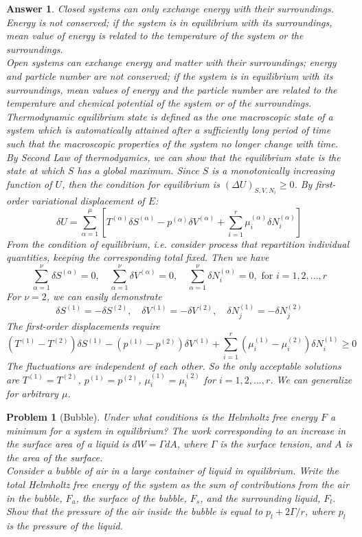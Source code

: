 \documentclass[a4paper]{article}
\newtheorem{ans}{Answer}[section]
\theoremstyle{new}
\newtheorem{qns}{Problem}[section]
\begin{document}
\begin{ans}
Closed systems can only exchange energy with their surroundings. Energy is not conserved; if the system is in equilibrium with its surroundings, mean value of energy is related to the temperature of the system or the surroundings.\\[5pt]
Open systems can exchange energy and matter with their surroundings; energy and particle number are not conserved; if the system is in equilibrium with its surroundings, mean values of energy and the particle number are related to the temperature and chemical potential of the system or of the surroundings.\\[5pt]
Thermodynamic equilibrium state is defined as the one macroscopic state of a system which is automatically attained after a sufficiently long period of time such that the macroscopic properties of the system no longer change with time.\\[5pt]
By Second Law of thermodyamics, we can show that the equilibrium state is the state at which $S$ has a global maximum. Since $S$ is a monotonically increasing function of $U$, then the condition for equilibrium is $(\Delta U)_{S,V,N_i}\geq0$. By first-order variational displacement of $E$:
$$\delta U=\sum_{\alpha=1}^\mu[T^{(\alpha)}\delta S^{(\alpha)}-p^{(\alpha)}\delta V^{(\alpha)}+\sum_{i=1}^r\mu_i^{(\alpha)}\delta N_i^{(\alpha)}]$$
From the condition of equilibrium, i.e. consider process that repartition individual quantities, keeping the corresponding total fixed. Then we have
$$\sum_{\alpha=1}^\nu\delta S^{(\alpha)}=0,\quad\sum_{\alpha=1}^\nu\delta V^{(\alpha)}=0,\quad\sum_{\alpha=1}^\nu\delta N_i^{(\alpha)}=0,\text{ for }i=1,2,...,r$$
For $\nu=2$, we can easily demonstrate 
$$\delta S^{(1)}=-\delta S^{(2)},\quad\delta V^{(1)}=-\delta V^{(2)},\quad\delta N_j^{(1)}=-\delta N_j^{(2)}$$
The first-order displacements require
$$(T^{(1)}-T^{(2)})\delta S^{(1)}-(p^{(1)}-p^{(2)})\delta V^{(1)}+\sum_{i=1}^r(\mu_i^{(1)}-\mu_i^{(2)})\delta N_i^{(1)}\geq0$$
The fluctuations are independent of each other. So the only acceptable solutions are $T^{(1)}=T^{(2)}$, $p^{(1)}=p^{(2)}$, $\mu_i^{(1)}=\mu_i^{(2)}$ for $i=1,2,...,r$. We can generalize for arbitrary $\mu$.
\end{ans}
\newpage
\begin{qns}[Bubble]
Under what conditions is the Helmholtz free energy $F$ a minimum for a system in equilibrium? The work corresponding to an increase in the surface area of a liquid is $dW = \Gamma dA$, where $\Gamma$ is the surface tension, and $A$ is the area of the surface.\\[5pt]
Consider a bubble of air in a large container of liquid in equilibrium. Write the total Helmholtz free energy of the system as the sum of contributions from the air in the bubble, $F_a$, the surface of the bubble, $F_s$, and the surrounding liquid, $F_l$. Show that the pressure of the air inside the bubble is equal to $p_l + 2\Gamma/r$, where $p_l$ is the pressure of the liquid.
\end{qns}
\end{document}
